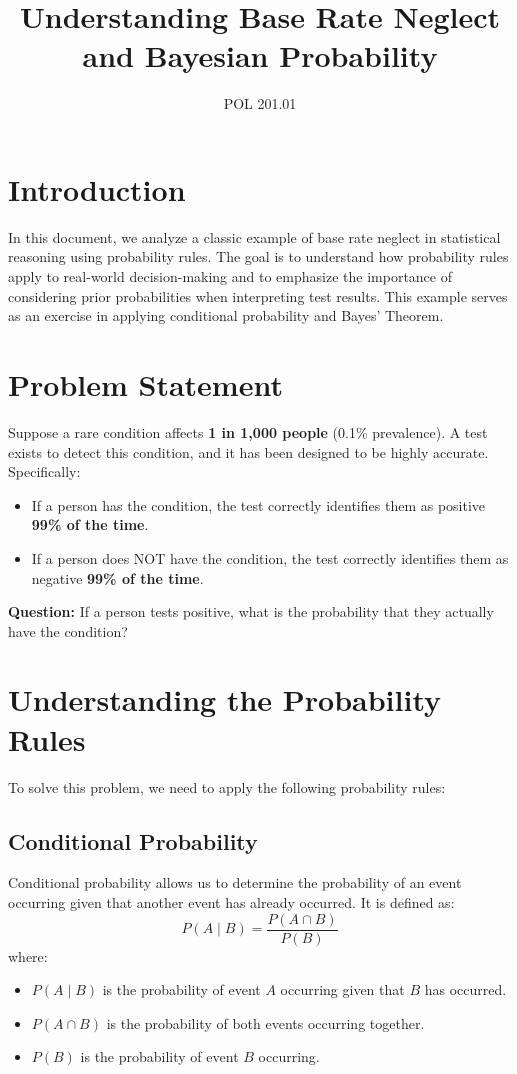 \documentclass{article}
\begin{document}
\title{Understanding Base Rate Neglect and Bayesian Probability}
\author{POL 201.01}
\date{}
\maketitle

\section{Introduction}

In this document, we analyze a classic example of base rate neglect in statistical reasoning using probability rules. The goal is to understand how probability rules apply to real-world decision-making and to emphasize the importance of considering prior probabilities when interpreting test results. This example serves as an exercise in applying conditional probability and Bayes' Theorem.

\section{Problem Statement}

Suppose a rare condition affects \textbf{1 in 1,000 people} (0.1\% prevalence). A test exists to detect this condition, and it has been designed to be highly accurate. Specifically:
\begin{itemize}
    \item If a person has the condition, the test correctly identifies them as positive \textbf{99\% of the time}.
    \item If a person does NOT have the condition, the test correctly identifies them as negative \textbf{99\% of the time}.
\end{itemize}

\textbf{Question:} If a person tests positive, what is the probability that they actually have the condition?

\section{Understanding the Probability Rules}

To solve this problem, we need to apply the following probability rules:

\subsection{Conditional Probability}
Conditional probability allows us to determine the probability of an event occurring given that another event has already occurred. It is defined as:
\begin{equation}
    P(A \mid B) = \frac{P(A \cap B)}{P(B)}
\end{equation}
where:
\begin{itemize}
    \item $P(A \mid B)$ is the probability of event $A$ occurring given that $B$ has occurred.
    \item $P(A \cap B)$ is the probability of both events occurring together.
    \item $P(B)$ is the probability of event $B$ occurring.
\end{itemize}
\end{document}
